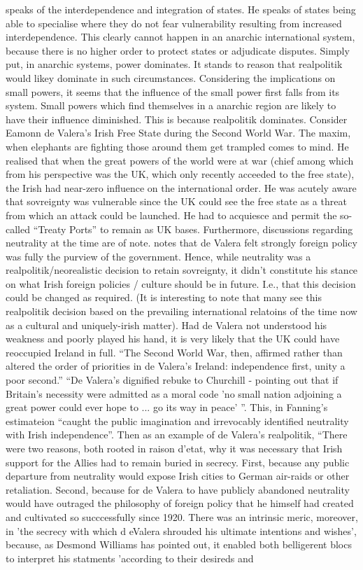 \parencite{WALTZ_1979} speaks of the interdependence and integration of states. He speaks of states being able to specialise where they do not fear vulnerability resulting from increased interdependence. This clearly cannot happen in an anarchic international system, because there is no higher order to protect states or adjudicate disputes. Simply put, in anarchic systems, power dominates. It stands to reason that realpolitik would likey dominate in such circumstances. Considering the implications on small powers, it seems that the influence of the small power first falls from its system. Small powers which find themselves in a anarchic region are likely to have their influence diminished. This is because realpolitik dominates. Consider Eamonn de Valera's Irish Free State during the Second World War. The maxim, when elephants are fighting those around them get trampled comes to mind. He realised that when the great powers of the world were at war (chief among which from his perspective was the UK, which only recently acceeded to the free state), the Irish had near-zero influence on the international order. He was acutely aware that sovreignty was vulnerable since the UK could see the free state as a threat from which an attack could be launched. He had to acquiesce and permit the so-called ``Treaty Ports'' to remain as UK bases. Furthermore, discussions regarding neutrality at the time are of note. \parencite{FANNING_2015} notes that de Valera felt strongly foreign policy was fully the purview of the government. Hence, while neutrality was a realpolitik/neorealistic decision to retain sovreignty, it didn't constitute his stance on what Irish foreign policies / culture should be in future. I.e., that this decision could be changed as required. (It is interesting to note that many see this realpolitik decision based on the prevailing international relatoins of the time now as a cultural and uniquely-irish matter). Had de Valera not understood his weakness and poorly played his hand, it is very likely that the UK could have reoccupied Ireland in full. ``The Second World War, then, affirmed rather than altered the order of priorities in de Valera's Ireland: independence first, unity a poor second.'' ``De Valera's dignified rebuke to Churchill - pointing out that if Britain's necessity were admitted as a moral code 'no small nation adjoining a great power could ever hope to ... go its way in peace' ''. This, in Fanning's estimateion ``caught the public imagination and irrevocably identified neutrality with Irish independence''. Then as an example of de Valera's realpolitik, ``There were two reasons, both rooted in raison d'etat, why it was necessary that Irish support for the Allies had to remain buried in secrecy. First, because any public departure from neutrality would expose Irish cities to German air-raids or other retaliation. Second, because for de Valera to have publicly abandoned neutrality would have outraged the philosophy of foreign policy that he himself had created and cultivated so succcessfully since 1920. There was an intrinsic meric, moreover, in 'the secrecy with which d eValera shrouded his ultimate intentions and wishes', because, as Desmond Williams has pointed out, it enabled both belligerent blocs to interpret his statments 'according to their desireds and 